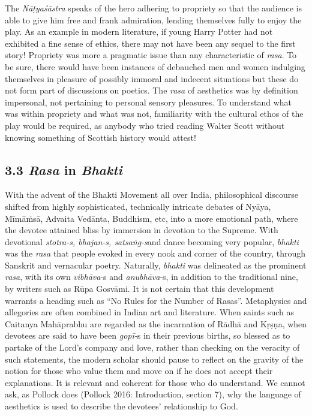 The \textit{Nāṭyaśāstra} speaks of the hero adhering to propriety so that the audience is able to give him free and frank admiration, lending themselves fully to enjoy the play. As an example in modern literature, if young Harry Potter had not exhibited a fine sense of ethics, there may not have been any sequel to the first story! Propriety was more a pragmatic issue than any characteristic of \textit{rasa}. To be sure, there would have been instances of debauched men and women indulging themselves in pleasure of possibly immoral and indecent situations but these do not form part of discussions on poetics. The \textit{rasa} of aesthetics was by definition impersonal, not pertaining to personal sensory pleasures. To understand what was within propriety and what was not, familiarity with the cultural ethos of the play would be required, as anybody who tried reading Walter Scott without knowing something of Scottish history would attest!

\vspace{-.3cm}

\subsection*{3.3 \textit{Rasa} in \textit{Bhakti}}

With the advent of the Bhakti Movement all over India, philosophical discourse shifted from highly sophisticated, technically intricate debates of Nyāya, Mīmāṁsā, Advaita Vedānta, Buddhism, etc, into a more emotional path, where the devotee attained bliss by immersion in devotion to the Supreme. With devotional \textit{stotra-s, bhajan-s, satsaṅg-s}\break and dance becoming very popular, \textit{bhakti} was the \textit{rasa} that people evoked in every nook and corner of the country, through Sanskrit and vernacular poetry. Naturally, \textit{bhakti} was delineated as the prominent \textit{rasa}, with its own \textit{vibhāva}-s and \textit{anubhāva}-s, in addition to the traditional nine, by writers such as Rūpa Gosvāmi. It is not certain that this development warrants a heading such as “No Rules for the Number of Rasas”. Metaphysics and allegories are often combined in Indian art and literature. When saints such as Caitanya Mahāprabhu are regarded as the incarnation of Rādhā and Kṛṣṇa, when devotees are said to have been \textit{gopī-}s in their previous births, so blessed as to partake of the Lord’s company and love, rather than checking on the veracity of such statements, the modern scholar should pause to reflect on the gravity of the notion for those who value them and move on if he does not accept their explanations. It is relevant and coherent for those who do understand. We cannot ask, as Pollock does (Pollock 2016: Introduction, section 7), why the language of aesthetics is used to describe the devotees’ relationship to God.


